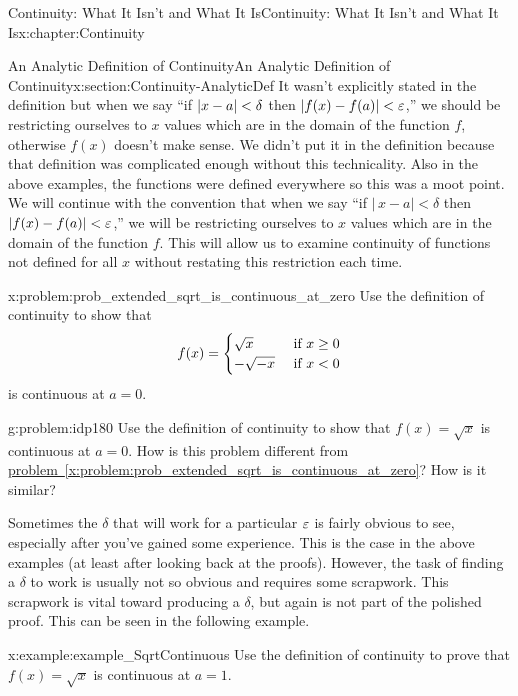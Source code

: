 \begin{chapterptx}{Continuity: What It Isn't and What It Is}{}{Continuity: What It Isn't and What It Is}{}{}{x:chapter:Continuity}
\begin{sectionptx}{An Analytic Definition of Continuity}{}{An Analytic Definition of Continuity}{}{}{x:section:Continuity-AnalyticDef}
		It wasn't explicitly stated in the definition but when we say ``if \(\left|x-a\right|< \delta\) then \(|f(x)-f(a)|<
		\varepsilon\),'' we should be restricting ourselves to \(x\) values which are in the domain of the function \(f\), otherwise \(f(x)\) doesn't make sense.  We didn't put it in the definition because that definition was complicated enough without this technicality.  Also in the above examples, the functions were defined everywhere so this was a moot point.  We will continue with the convention that when we say ``if \(|\,x-a|\lt \delta\) then \(|f(x)-f(a)|< \varepsilon\),'' we will be restricting ourselves to \(x\) values which are in the domain of the function \(f\).  This will allow us to examine continuity of functions not defined for all \(x\) without restating this restriction each time.%
		\begin{problem}{}{x:problem:prob_extended_sqrt_is_continuous_at_zero}%
			 Use the definition of continuity to show that%
			\begin{equation*}
				f(x)= \begin{cases}\sqrt{x} &  \text{ if }  x\ge0\\ -\sqrt{-x} &  \text{ if }  x< 0 \end{cases}
			\end{equation*}
			is continuous at \(a=0\).%
		\end{problem}
		\begin{problem}{}{g:problem:idp180}%
			 Use the definition of continuity to show that \(f(x)=
			\sqrt{x}\) is continuous at \(a=0\).  How is this problem different from \hyperref[x:problem:prob_extended_sqrt_is_continuous_at_zero]{problem~{\xreffont\ref{x:problem:prob_extended_sqrt_is_continuous_at_zero}}}? How is it similar?%
		\end{problem}
		Sometimes the \(\delta\) that will work for a particular \(\varepsilon\) is fairly obvious to see, especially after you've gained some experience.  This is the case in the above examples (at least after looking back at the proofs).  However, the task of finding a \(\delta\) to work is usually not so obvious and requires some scrapwork.  This scrapwork is vital toward producing a \(\delta\), but again is not part of the polished proof.  This can be seen in the following example.%
		\begin{example}{}{x:example:example_SqrtContinuous}%
			Use the definition of continuity to prove that \(f(x)=\sqrt{x}\) is continuous at \(a=1\).%
			\par

\end{example}
\end{sectionptx}
\end{chapterptx}
